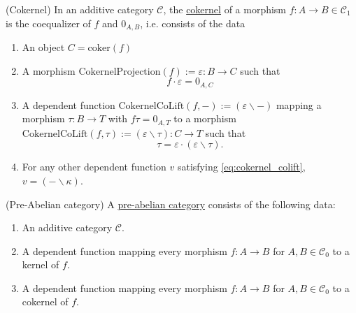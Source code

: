 \begin{definition}{(Cokernel)}
In an additive category $\mathcal{C}$, the \ul{cokernel} of a morphism $f : A \rightarrow B \in \mathcal{C}_{1}$ is the coequalizer of
$f$ and $0_{A,B}$, i.e. consists of the data
\begin{enumerate}
\renewcommand{\labelenumi}{(\theenumi)}
\item An object $C = \mathrm{coker}(f)$
\item A morphism $\mathrm{CokernelProjection}(f) := \varepsilon : B \rightarrow C$ such that
\[
f \cdot \varepsilon = 0_{A,C}
\]
\item A dependent function $\mathrm{CokernelCoLift}(f,-) := ( \varepsilon \backslash -)$ mapping a morphism $\tau : B \rightarrow T$ with
$f \tau  = 0_{A,T}$ to a morphism $\mathrm{CokernelCoLift}(f,\tau) := ( \varepsilon \backslash \tau) : C \rightarrow T$ such that
\[
\tau =\label{eq:cokernel_colift} \varepsilon \cdot (\varepsilon \backslash \tau).
\]
\item For any other dependent function $v$ satisfying \eqref{eq:cokernel_colift}, $v = ( - \backslash \kappa)$.
\end{enumerate}
\end{definition}

\begin{definition}{(Pre-Abelian category)}
A \ul{pre-abelian category} consists of the following data:
\begin{enumerate}
\item An additive category $\mathcal{C}$.
\item A dependent function mapping every morphism $f : A \rightarrow B$ for $A, B \in \mathcal{C}_{0}$ to a
kernel of $f$.
\item A dependent function mapping every morphism $f : A \rightarrow B$ for $A, B \in \mathcal{C}_{0}$ to a
cokernel of $f$.
\end{enumerate}
\end{definition}

